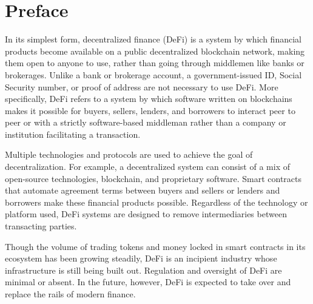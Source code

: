 \chapter*{Preface}
\thispagestyle{fancy}
\label{preface}
\hspace*{5cm}


In its simplest form, decentralized finance (DeFi) is a system by which financial products become available on a public decentralized blockchain network, making them open to anyone to use, rather than going through middlemen like banks or brokerages. Unlike a bank or brokerage account, a government-issued ID, Social Security number, or proof of address are not necessary to use DeFi. More specifically, DeFi refers to a system by which software written on blockchains makes it possible for buyers, sellers, lenders, and borrowers to interact peer to peer or with a strictly software-based middleman rather than a company or institution facilitating a transaction.

Multiple technologies and protocols are used to achieve the goal of decentralization. For example, a decentralized system can consist of a mix of open-source technologies, blockchain, and proprietary software. Smart contracts that automate agreement terms between buyers and sellers or lenders and borrowers make these financial products possible. Regardless of the technology or platform used, DeFi systems are designed to remove intermediaries between transacting parties.

Though the volume of trading tokens and money locked in smart contracts in its ecosystem has been growing steadily, DeFi is an incipient industry whose infrastructure is still being built out. Regulation and oversight of DeFi are minimal or absent. In the future, however, DeFi is expected to take over and replace the rails of modern finance.



\cleardoublepage